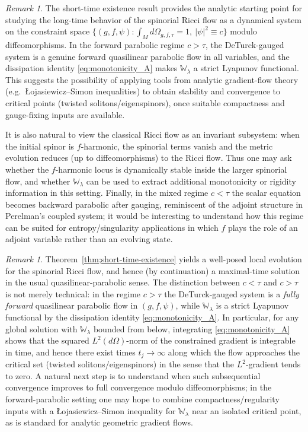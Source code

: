 \documentclass{amsart}
\theoremstyle{definition}
\theoremstyle{remark}
\newtheorem{remark}[theorem]{Remark}
\numberwithin{equation}{section}
\begin{document}
\medskip

\begin{remark}
The short-time existence result provides the analytic starting point for studying the long-time
behavior of the spinorial Ricci flow as a dynamical system on the constraint space
$\{(g,f,\psi): \int_M d\Omega_{g,f,\tau}=1,\ |\psi|^2\equiv c\}$ modulo diffeomorphisms. In the forward
parabolic regime $c>\tau$, the DeTurck-gauged system is a genuine forward quasilinear parabolic flow in
all variables, and the dissipation identity \eqref{eq:monotonicity_A} makes $\mathbb{W}_\lambda$ a strict Lyapunov
functional. This suggests the possibility of applying tools from analytic gradient-flow theory
(e.g.\ {\L}ojasiewicz--Simon inequalities) to obtain stability and convergence to critical points
(twisted solitons/eigenspinors), once suitable compactness and gauge-fixing inputs are available.

It is also natural to view the classical Ricci flow as an invariant subsystem: when the initial spinor is
$f$-harmonic, the spinorial terms vanish and the metric evolution reduces (up to diffeomorphisms) to the
Ricci flow. Thus one may ask whether the $f$-harmonic locus is dynamically stable inside the larger
spinorial flow, and whether $\mathbb{W}_\lambda$ can be used to extract additional monotonicity or rigidity
information in this setting. Finally, in the mixed regime $c<\tau$ the scalar equation becomes backward
parabolic after gauging, reminiscent of the adjoint structure in Perelman's coupled system; it would be
interesting to understand how this regime can be suited for entropy/singularity applications in
which $f$ plays the role of an adjoint variable rather than an evolving state.
\end{remark}
\medskip

\begin{remark}
Theorem~\ref{thm;short-time-existence} yields a well-posed local evolution for the spinorial Ricci flow,
and hence (by continuation) a maximal-time solution in the usual quasilinear-parabolic sense. The
distinction between $c<\tau$ and $c>\tau$ is not merely technical: in the regime $c>\tau$ the DeTurck-gauged
system is a \emph{fully forward} quasilinear parabolic flow in $(g,f,\psi)$, while $\mathbb{W}_\lambda$ is a strict
Lyapunov functional by the dissipation identity \eqref{eq:monotonicity_A}. In particular, for any global
solution with $\mathbb{W}_\lambda$ bounded from below, integrating \eqref{eq:monotonicity_A} shows that the squared
$L^2(d\Omega)$-norm of the constrained gradient is integrable in time, and hence there exist times
$t_j\to\infty$ along which the flow approaches the critical set (twisted solitons/eigenspinors) in the
sense that the $L^2$-gradient tends to zero. A natural next step is to understand when such
subsequential convergence improves to full convergence modulo diffeomorphisms; in the forward-parabolic
setting one may hope to combine compactness/regularity inputs with a {\L}ojasiewicz--Simon inequality
for $\mathbb{W}_\lambda$ near an isolated critical point, as is standard for analytic geometric gradient flows.
\end{remark}
\end{document}

